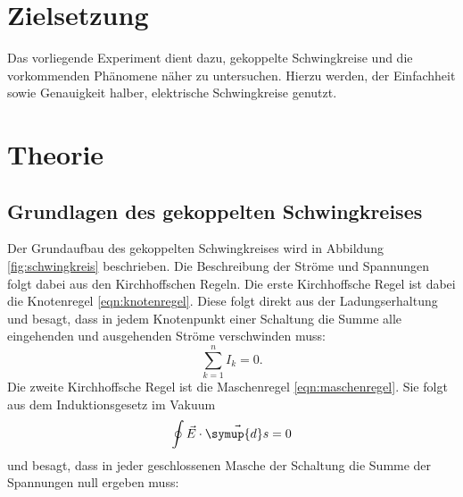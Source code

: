 \section{Zielsetzung}
Das vorliegende Experiment dient dazu, gekoppelte Schwingkreise und die vorkommenden Phänomene näher zu untersuchen.
Hierzu werden, der Einfachheit sowie Genauigkeit halber, elektrische Schwingkreise genutzt.

\section{Theorie}
\subsection{Grundlagen des gekoppelten Schwingkreises}
\label{sec:Theorie}
Der Grundaufbau des gekoppelten Schwingkreises wird in Abbildung \ref{fig:schwingkreis} beschrieben.
Die Beschreibung der Ströme und Spannungen folgt dabei aus den Kirchhoffschen Regeln.
Die erste Kirchhoffsche Regel ist dabei die Knotenregel \eqref{eqn:knotenregel}.
Diese folgt direkt aus der Ladungserhaltung und besagt, dass in jedem Knotenpunkt einer Schaltung die Summe alle eingehenden und ausgehenden Ströme verschwinden muss:
\begin{equation}
  \sum_{k=1}^n I_k = 0.
  \label{eqn:knotenregel}
\end{equation}
Die zweite Kirchhoffsche Regel ist die Maschenregel \eqref{eqn:maschenregel}.
Sie folgt aus dem Induktionsgesetz im Vakuum
\begin{equation}
\oint \vec{E} \cdot \vec{\symup{d}s} = 0
\end{equation}
und besagt, dass in jeder geschlossenen Masche der Schaltung die Summe der Spannungen null ergeben muss:
